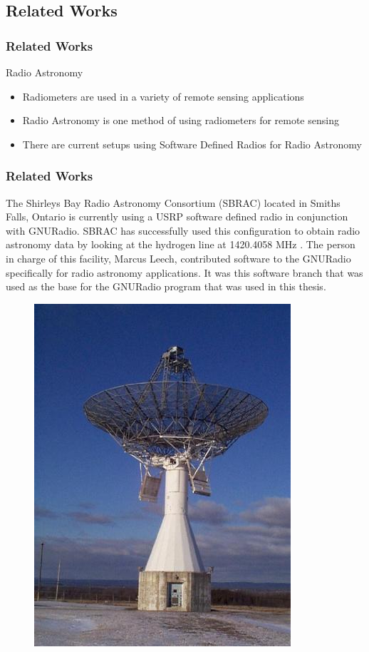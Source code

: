 \documentclass[notes]{beamer}
\begin{document}
\subsection{Related Works}
\begin{frame}
\frametitle{Related Works}
\begin{block}{Radio Astronomy}
\begin{itemize}
\item Radiometers are used in a variety of remote sensing applications
\item Radio Astronomy is one method of using radiometers for remote sensing
\item There are current setups using Software Defined Radios for Radio Astronomy
\end{itemize}
\end{block}
\end{frame}

\begin{frame}
\frametitle{Related Works}

The Shirleys Bay Radio Astronomy Consortium (SBRAC) located in Smiths Falls, Ontario is currently using a USRP software defined radio in conjunction with GNURadio.  SBRAC has successfully used this configuration to obtain radio astronomy data by looking at the hydrogen line at 1420.4058 MHz \cite{Leech2007}.  The person in charge of this facility, Marcus Leech, contributed software to the GNURadio specifically for radio astronomy applications.  It was this software branch that was used as the base for the GNURadio program that was used in this thesis.

\begin{figure}\label{sbrac}
\includegraphics[width=0.2\linewidth]{images/ra.jpg}
\end{figure}
\end{frame}
\end{document}
